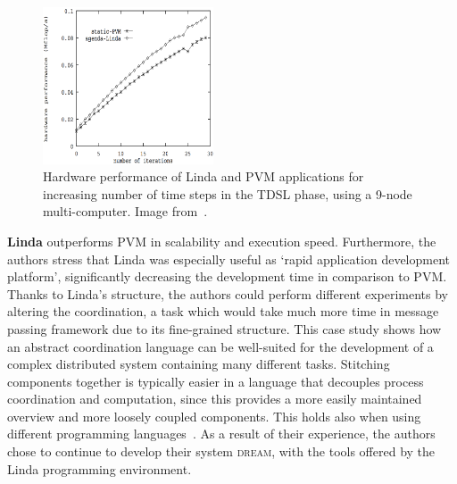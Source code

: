 \begin{figure}[]
\centering
\includegraphics[page=1, width=0.45\textwidth]{images/pvmVsLinda.png}
\caption[]{Hardware performance of Linda and PVM applications for increasing number of time steps in the TDSL phase, using a 9-node multi-computer. Image from~\cite{LindaVSMessage}.}
\label{fig:pvmVsLinda}
\end{figure}

\textbf{Linda} outperforms PVM in scalability and execution speed. Furthermore, the authors stress that Linda was especially useful as `rapid application development platform', significantly decreasing the development time in comparison to PVM. Thanks to Linda's structure, the authors could perform different experiments by altering the coordination, a task which would take much more time in message passing framework due to its fine-grained structure. This case study shows how an abstract coordination language can be well-suited for the development of a complex distributed system containing many different tasks. Stitching components together is typically easier in a language that decouples process coordination and computation, since this provides a more easily maintained overview and more loosely coupled components. This holds also when using different programming languages~\cite{reoLinda}. As a result of their experience, the authors chose to continue to develop their system \textsc{dream}, with the tools offered by the Linda programming environment.

